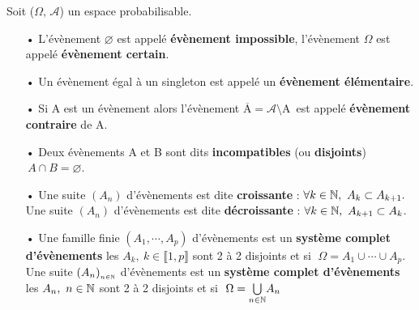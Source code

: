 \noindent Soit (\(\Omega,\,\mathcal{A}\)) un espace probabilisable.
\begin{itemize}
    \item[•] L'évènement \(\varnothing\) est appelé \textbf{évènement impossible}, l'évènement \(\Omega\) est appelé \textbf{évènement certain}.
    
    \item[•] Un évènement égal à un singleton est appelé un \textbf{évènement élémentaire}.
    
    \item[•] Si A est un évènement alors l'évènement $\overline{\text{A}}=\mathcal{A}\!\setminus\! \text{A}\,$ est appelé \textbf{évènement contraire} de A.
    
    \item[•] Deux évènements A et B sont dits \textbf{incompatibles} (ou \textbf{disjoints}) \ssi \(\,A\cap B=\varnothing\).
    
    \item[•] Une suite \((A_n)\) d'évènements est dite \textbf{croissante} \ssi : \(\forall k\in \mathbb{N},\ A_k\subset A_{k+1}.\)\vspace{0.1cm} \\
    Une suite \((A_n)\) d'évènements est dite \textbf{décroissante} \ssi : \(\forall k\in \mathbb{N},\ A_{k+1} \subset A_k\).

    \item[•] Une famille finie \((A_1,\cdots,A_p)\) d'évènements est un \textbf{système complet d'évènements} \ssi les \(A_k,\ k\in \llbracket 1,p \rrbracket\) sont 2 à 2 disjoints et si \(\;\Omega=A_1\cup\cdots\cup A_p.\)\vspace{0.1cm}\\
    Une suite \((A_n)_{_{n\in \mathbb{N}}}\) d'évènements est un \textbf{système complet d'évènements} \ssi les \(A_n,\ n\in \mathbb{N}\) sont 2 à 2 disjoints et si \(\;\Omega=\underset{n\in \mathbb{N}}{\bigcup}A_n\)
    
\end{itemize}


\vspace{1.5cm}


